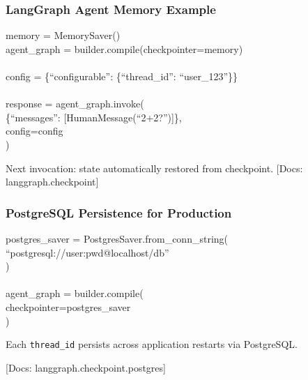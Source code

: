 \documentclass[aspectratio=169,11pt]{beamer}
\newcommand{\docref}[1]{{\scriptsize\color{docgray}[Docs: #1]}}
\begin{document}
\begin{frame}
  \frametitle{LangGraph Agent Memory Example}
  \begin{codebox}
    \ttfamily\small
    memory = MemorySaver() \\
    agent\_graph = builder.compile(checkpointer=memory) \\
    \\
    config = \{``configurable'': \{``thread\_id'': ``user\_123''\}\} \\
    \\
    response = agent\_graph.invoke( \\
    \hspace{2em} \{``messages'': [HumanMessage(``2+2?'')]\}, \\
    \hspace{2em} config=config \\
    )
  \end{codebox}
  \vspace{0.6em}
  Next invocation: state automatically restored from checkpoint.
  \docref{langgraph.checkpoint}
\end{frame}

\begin{frame}
  \frametitle{PostgreSQL Persistence for Production}
  \begin{codebox}
    \ttfamily\small
    postgres\_saver = PostgresSaver.from\_conn\_string( \\
    \hspace{2em} ``postgresql://user:pwd@localhost/db'' \\
    ) \\
    \\
    agent\_graph = builder.compile( \\
    \hspace{2em} checkpointer=postgres\_saver \\
    )
  \end{codebox}
  \vspace{0.6em}
  \begin{tipbox}[Persistence]
    Each \texttt{thread\_id} persists across application restarts via PostgreSQL.
  \end{tipbox}
  \docref{langgraph.checkpoint.postgres}
\end{frame}
\end{document}
